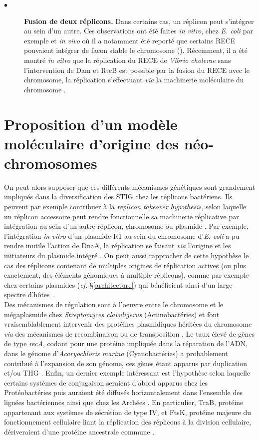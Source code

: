 \begin{description}
	\item[$\bullet$] \textbf{Fusion de deux réplicons.} Dans certains cas, un réplicon peut s'intégrer au sein d'un autre. Ces observations ont été faites \textit{in vitro}, chez \textit{E. coli} \citep{bernander1991coli} par exemple et \textit{in vivo} où il a notamment été reporté que certains RECE pouvaient intégrer de facon stable le chromosome (\citep{guo2003natural}). Récemment, il a été montré \textit{in vitro} que la réplication du RECE de \textit{Vibrio cholerae} sans l'intervention de Dam et RtcB est possible par la fusion du RECE avec le chromosome, la réplication s'effectuant \textit{via} la machinerie moléculaire du chromosome \citep{val2014fuse}.
\end{description}  
	
	
	
\section{Proposition d'un modèle moléculaire d'origine des néo-chromosomes} 
	On peut alors supposer que ces différents mécanismes génétiques sont grandement impliqués dans la diversification des STIG chez les réplicons bactériens. Ils peuvent par exemple contribuer à la \textit{replicon takeover hypothesis}, selon laquelle un réplicon accessoire peut rendre fonctionnelle sa machinerie réplicative par intégration au sein d'un autre réplicon, chromosome ou plasmide \citep{mcgeoch2008extra}. Par exemple, l'intégration \textit{in vitro} d'un plasmide R1 au sein du chromosome d'\textit{E. coli} a pu rendre inutile l'action de DnaA, la réplication se faisant \textit{via} l'origine et les initiateurs du plasmide intégré \citep{bernander1991coli}. On peut aussi rapprocher de cette hypothèse le cas des réplicons contenant de multiples origines de réplication actives (ou plus exactement, des éléments génomiques à multiple réplicons), comme par exemple chez certains plasmides (\textit{cf.} \S \ref{architecture}) qui bénéficient ainsi d'un large spectre d'hôtes \citep{Toukdarian2004}. \\
	Des mécanismes de régulation sont à l'oeuvre entre le chromosome et le mégaplasmide chez \textit{Streptomyces clavuligerus} (Actinobactéries) et font vraisemblablement intervenir des protéines plasmidiques héritées du chromosome \textit{via} des mécanismes de recombinaison ou de transposition \citep{medema2010sequence}. Le taux élevé de gènes de type \textit{recA}, codant pour une protéine impliquée dans la réparation de l'ADN, dans le génome d'\textit{Acaryochloris marina} (Cyanobactéries) a probablement contribué à l'expansion de son génome, ces gènes étant apparus par duplication et/ou THG \citep{swingley2008niche}. Enfin, un dernier exemple intéressant est l'hypothèse selon laquelle certains systèmes de conjugaison seraient d'abord apparus chez les Protéobactéries puis auraient été diffusés horizontalement dans l'ensemble des lignées bactériennes ainsi que chez les Archées \citep{Guglielmini2013}. En particulier, TraB, protéine appartenant aux systèmes de sécrétion de type IV, et FtsK, protéine majeure du fonctionnement cellulaire liant la réplication des réplicons à la division cellulaire, dériveraient d'une protéine ancestrale commune \citep{Vogelmann2011}.\\
